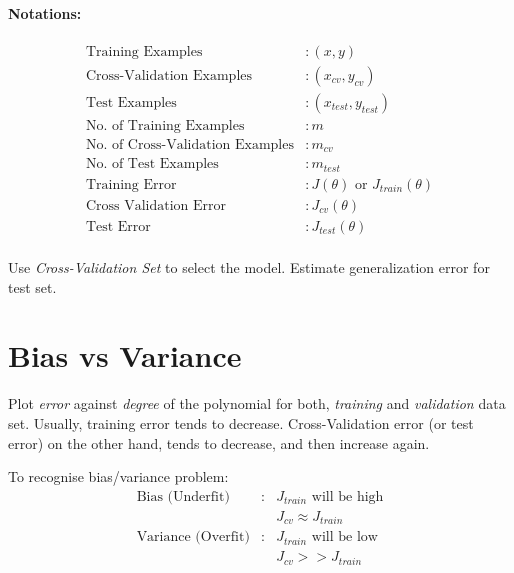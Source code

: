 \paragraph{Notations:}
\begin{align*}
	\text{Training Examples}                & : (x, y)                                  \\
	\text{Cross-Validation Examples}        & : (x_{cv}, y_{cv})                        \\
	\text{Test Examples}                    & : (x_{test}, y_{test})                    \\
	\text{No. of Training Examples}         & : m                                       \\
	\text{No. of Cross-Validation Examples} & : m_{cv}                                  \\
	\text{No. of Test Examples}             & : m_{test}                                \\
	\text{Training Error}                   & : J(\theta) \text{ or } J_{train}(\theta) \\
	\text{Cross Validation Error}           & : J_{cv}(\theta)                          \\
	\text{Test Error}                       & : J_{test}(\theta)                        \\
\end{align*}

Use \emph{Cross-Validation Set} to select the model. Estimate generalization
error for test set.

\section{Bias vs Variance}
Plot \emph{error} against \emph{degree} of the polynomial for both, \emph{training}
and \emph{validation} data set. Usually, training error tends to decrease. Cross-Validation
error (or test error) on the other hand, tends to decrease, and then increase again.

To recognise bias/variance problem:
\begin{align*}
	\text{Bias (Underfit)}    & : & J_{train} \text{ will be high} \\
	                          &   & J_{cv} \approx J_{train}       \\
	\text{Variance (Overfit)} & : & J_{train} \text{ will be low}  \\
	                          &   & J_{cv} >> J_{train}            \\
\end{align*}

